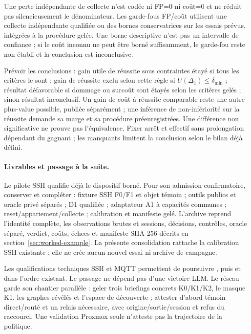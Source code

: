\documentclass[11pt,a4paper]{article}
\newcommand{\code}[1]{{\small\ttfamily\path{#1}}}
\newcommand{\scenariolink}[1]{\hyperref[scenario:#1]{\code{#1}}}
\begin{document}
Une perte indépendante de collecte n’est codée ni FP=0 ni coût=0 et ne réduit pas silencieusement le dénominateur. Les garde-fous FP/coût utilisent une collecte indépendante qualifiée ou des bornes conservatrices sur les essais prévus, intégrées à la procédure gelée. Une borne descriptive n’est pas un intervalle de confiance ; si le coût inconnu ne peut être borné suffisamment, le garde-fou reste non établi et la conclusion est inconclusive.

Prévoir les conclusions : gain utile de réussite sous contraintes étayé si tous les critères le sont ; gain de réussite exclu selon cette règle si $U(\Delta_1)\leq\delta_{\min}$ ; résultat défavorable si dommage ou surcoût sont étayés selon les critères gelés ; sinon résultat inconclusif. Un gain de coût à réussite comparable reste une autre plus-value possible, publiée séparément ; une inférence de non-infériorité sur la réussite demande sa marge et sa procédure préenregistrées. Une différence non significative ne prouve pas l’équivalence. Fixer arrêt et effectif sans prolongation dépendant du gagnant ; les manquants limitent la conclusion selon le bilan déjà défini.

\paragraph{Livrables et passage à la suite.}
Le pilote SSH qualifie déjà le dispositif borné. Pour son admission confirmatoire, conserver et compléter : fixture SSH F0/F1 et objet témoin ; outils publics et oracle privé séparés ; D1 qualifiée ; adaptateur A1 à capacités communes ; reset/appariement/collecte ; calibration et manifeste gelé. L’archive reprend l’identité complète, les observations brutes et sessions, décisions, contrôles, oracle séparé, verdict, coûts, échecs et manifeste SHA-256 décrits en section~\ref{sec:worked-example}. La présente consolidation rattache la calibration SSH existante ; elle ne crée aucun nouvel essai ni archive de campagne.

Les qualifications techniques SSH et MQTT permettent de poursuivre \scenariolink{s_api_organisations}, puis \scenariolink{s_mqtt_reprise} et \scenariolink{s_cache_identites} dans l’ordre existant. Le passage ne dépend pas d’une victoire LLM. Le réseau garde son chantier parallèle : geler trois briefings concrets K0/K1/K2, le masque K1, les graphes révélés et l’espace de découverte ; attester d’abord témoin direct/routé et un relais nécessaire, avec origine/sortie/session et refus du raccourci. Une validation Proxmox seule n’atteste pas la trajectoire de la politique.
\end{document}
